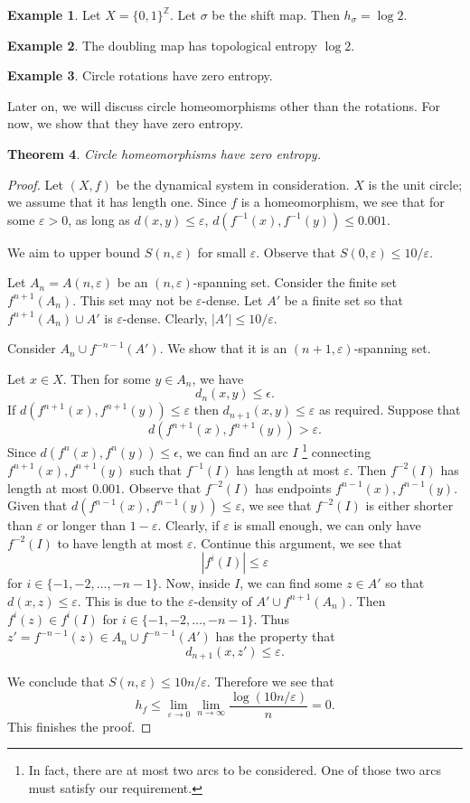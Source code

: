 \documentclass[12pt]{article}
\newtheorem{theorem}{Theorem}[section]
\theoremstyle{definition}
\newtheorem{example}[theorem]{Example}
\theoremstyle{remark}
\begin{document}
\begin{example}
    Let $X=\{0,1\}^{\mathbb{Z}}$. Let $\sigma$ be the shift map. Then $h_\sigma=\log 2$.
\end{example}
\begin{example}
    The doubling map has topological entropy $\log 2$.
\end{example}
\begin{example}
    Circle rotations have zero entropy.
\end{example}
Later on, we will discuss circle homeomorphisms other than the rotations. For now, we show that they have zero entropy.
\begin{theorem}
    Circle homeomorphisms have zero entropy.
\end{theorem}
\begin{proof}
    Let $(X,f)$ be the dynamical system in consideration. $X$ is the unit circle; we assume that it has length one. Since $f$ is a homeomorphism, we see that for some $\varepsilon>0$, as long as $d(x,y)\leq \varepsilon$, $d(f^{-1}(x),f^{-1}(y))\leq 0.001.$

    We aim to upper bound $S(n,\varepsilon)$ for small $\varepsilon$. Observe that $S(0,\varepsilon)\leq 10/\varepsilon$.

    Let $A_n=A(n,\varepsilon)$ be an $(n,\varepsilon)$-spanning set. Consider the finite set $f^{n+1}(A_n).$ This set may not be $\varepsilon$-dense. Let $A'$ be a finite set so that $f^{n+1}(A_n)\cup A'$ is $\varepsilon$-dense. Clearly, $|A'|\leq 10/\varepsilon.$

    Consider $A_n\cup f^{-n-1}(A').$ We show that it is an $(n+1,\varepsilon)$-spanning set.
    
    Let $x\in X$. Then for some $y\in A_n$, we have
    \[
    d_n(x,y)\leq \epsilon.
    \]
    If $d(f^{n+1}(x),f^{n+1}(y))\leq \varepsilon$ then $d_{n+1}(x,y)\leq \varepsilon$ as required. Suppose that \[d(f^{n+1}(x),f^{n+1}(y))>\varepsilon.\] Since $d(f^n(x),f^n(y))\leq \epsilon$, we can find an arc $I$ \footnote{In fact, there are at most two arcs to be considered. One of those two arcs must satisfy our requirement.} connecting $f^{n+1}(x),f^{n+1}(y)$ such that $f^{-1}(I)$ has length at most $\varepsilon$. Then $f^{-2}(I)$ has length at most $0.001$. Observe that $f^{-2}(I)$ has endpoints $f^{n-1}(x),f^{n-1}(y).$ Given that $d(f^{n-1}(x),f^{n-1}(y))\leq \varepsilon$, we see that $f^{-2}(I)$ is either shorter than $\varepsilon$ or longer than $1-\varepsilon$. Clearly, if $\varepsilon$ is small enough, we can only have $f^{-2}(I)$ to have length at most $\varepsilon.$ Continue this argument, we see that
    \[
    |f^{i}(I)|\leq \varepsilon
    \]
    for $i\in\{-1,-2,\dots,-n-1\}.$ Now, inside $I$, we can find some $z\in A'$ so that $d(x,z)\leq \varepsilon$. This is due to the $\varepsilon$-density of $A'\cup f^{n+1}(A_n).$ Then $f^{i}(z)\in f^{i}(I)$ for $i\in\{-1,-2,\dots,-n-1\}.$ Thus $z'=f^{-n-1}(z)\in A_n\cup f^{-n-1}(A')$ has the property that
    \[
    d_{n+1}(x,z')\leq\varepsilon.
    \]

    We conclude that $S(n,\varepsilon)\leq 10n/\varepsilon.$ Therefore we see that
    \[
    h_f\leq \lim_{\varepsilon\to 0}\lim_{n\to\infty} \frac{\log (10n/\varepsilon)}{n}=0.
    \]
    This finishes the proof.
\end{proof}
\end{document}
